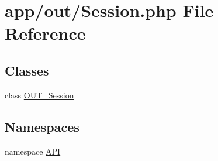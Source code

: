\hypertarget{Session_8php}{
\section{app/out/Session.php File Reference}
\label{d4/db7/Session_8php}
}
\subsection*{Classes}
\begin{DoxyCompactItemize}
\item 
class \hyperlink{classOUT__Session}{OUT\_\-Session}
\end{DoxyCompactItemize}
\subsection*{Namespaces}
\begin{DoxyCompactItemize}
\item 
namespace \hyperlink{namespaceAPI}{API}
\end{DoxyCompactItemize}
